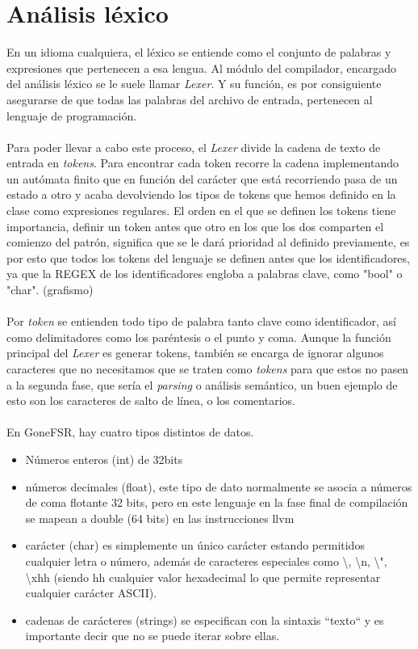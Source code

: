 \section{Análisis léxico}
En un idioma cualquiera,  el léxico se entiende como el conjunto de palabras y expresiones que pertenecen a esa lengua. Al módulo del compilador, encargado del análisis léxico se le suele llamar \textit{Lexer}. Y su función, es por consiguiente asegurarse de que todas las palabras del archivo de entrada, pertenecen al lenguaje de programación. \\\\
Para poder llevar a cabo este proceso, el \textit{Lexer} divide la cadena de texto de entrada en \textit{tokens}. Para encontrar cada token recorre la cadena implementando un autómata finito que en función del carácter que está recorriendo pasa de un estado a otro y acaba devolviendo los tipos de tokens que hemos definido en la clase como expresiones regulares. El orden en el que se definen los tokens tiene importancia, definir un token antes que otro en los que los dos comparten el comienzo del patrón, significa que se le dará prioridad al definido previamente, es por esto que todos los tokens del lenguaje se definen antes que los identificadores, ya que la REGEX de los identificadores engloba a palabras clave, como "bool" o "char". (grafismo)
\\\\
Por \textit{token} se entienden todo tipo de palabra tanto clave como identificador, así como delimitadores como los paréntesis o el punto y coma. Aunque la función principal del \textit{Lexer} es generar tokens, también se encarga de ignorar algunos caracteres que no necesitamos que se traten como \textit{tokens} para que estos no pasen a la segunda fase, que sería el \textit{parsing} o análisis semántico, un buen ejemplo de esto son los caracteres de salto de línea, o los comentarios.\\\\
En GoneFSR, hay cuatro tipos distintos de datos. 
\begin{itemize}
    \item{Números enteros (int) de 32bits}
    \item{números decimales (float), este tipo de dato normalmente se asocia a números de coma flotante 32 bits, pero en este lenguaje en la fase final de compilación se mapean a double (64 bits) en las instrucciones llvm}
    \item{carácter (char)  es simplemente un único carácter estando permitidos cualquier letra o número, además de caracteres especiales como \textbackslash, \textbackslash n, \textbackslash ", \textbackslash xhh (siendo hh cualquier valor hexadecimal lo que permite representar cualquier carácter ASCII).}
    \item{cadenas de carácteres (strings) se especifican con la sintaxis ``texto`` y es importante decir que no se puede iterar sobre ellas. }\\
\end{itemize}

